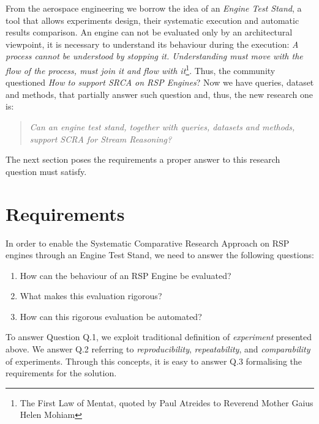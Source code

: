 From the aerospace engineering we borrow the idea of an \textit{Engine Test Stand}, a tool that allows experiments design, their systematic execution and automatic results comparison. An engine can not be evaluated only by an architectural viewpoint, it is necessary to understand its behaviour during the execution: \textit{A process cannot be understood by stopping it. Understanding must move with the flow of the process, must join it and flow with it}\footnote{The First Law of Mentat, quoted by Paul Atreides to Reverend Mother Gaius Helen Mohiam}. Thus, the community questioned \textit{How to support SRCA on RSP Engines}? Now we have queries, dataset and methods, that partially answer such question and, thus, the new research one is: \begin{quote}
\textit{Can an engine test stand, together with queries, datasets and methods, support SCRA for Stream Reasoning?}
\end{quote} The next section poses the requirements a proper answer to this research question must satisfy.

\section{Requirements} \label{sec:requirements}

In order to enable the Systematic Comparative Research Approach on RSP engines through an Engine Test Stand, we need to answer the following questions: 
\begin{enumerate}
\item[Q.1] How can the behaviour of an RSP Engine be evaluated? 
\item[Q.2] What makes this evaluation rigorous? 
\item[Q.3] How can this rigorous evaluation be automated?
\end{enumerate} To answer Question Q.1, we exploit traditional definition of \textit{experiment} presented above. We answer Q.2 referring to \textit{reproducibility}, \textit{repeatability}, and \textit{comparability} of experiments. Through this concepts, it is easy to answer Q.3 formalising the requirements for the solution.

